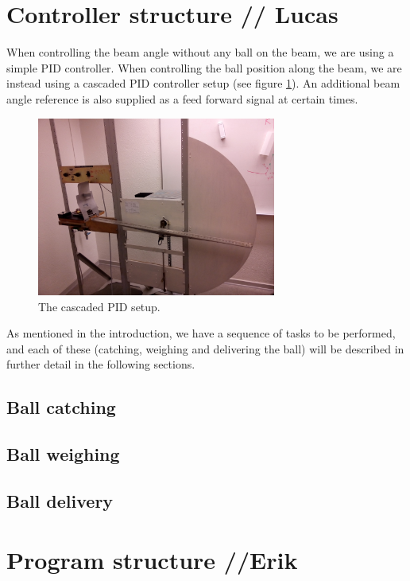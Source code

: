 \documentclass{article}
\begin{document}
\section{Controller structure // Lucas}
When controlling the beam angle without any ball on the beam, we are using a simple PID controller. When controlling the ball position along the beam, we are instead using a cascaded PID controller setup (see figure \ref{cascaded_pid_fig}). An additional beam angle reference is also supplied as a feed forward signal at certain times.
\begin{figure}
\centering
\includegraphics[width=0.7\textwidth]{figures/process_fig.jpg}
\caption{The cascaded PID setup.}\label{cascaded_pid_fig}
\end{figure}

As mentioned in the introduction, we have a sequence of tasks to be performed, and each of these (catching, weighing and delivering the ball) will be described in further detail in the following sections.

\subsection{Ball catching}


\subsection{Ball weighing}


\subsection{Ball delivery}


\section{Program structure //Erik}

\end{document}
